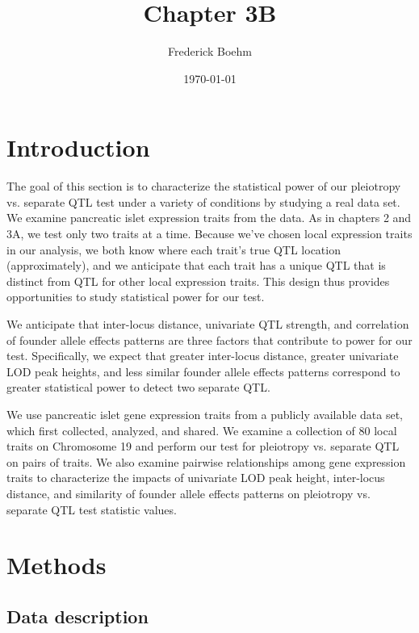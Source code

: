 \documentclass{article}
\title{Chapter 3B}
\author{Frederick Boehm}
\date{\today}
\begin{document}
\doublespacing
\maketitle
\listoftodos
\tableofcontents
\listoffigures
\listoftables



\section{Introduction}

The goal of this section is to characterize the statistical power of our pleiotropy vs. separate QTL test under a variety of conditions by studying a real data set. We examine pancreatic islet expression traits from the \citet{keller2018genetic} data. As in chapters 2 and 3A, we test only two traits at a time. Because we’ve chosen local expression traits in our analysis, we both know where each trait’s true QTL location (approximately), and we anticipate that each trait has a unique QTL that is distinct from QTL for other local expression traits. This design thus provides opportunities to study statistical power for our test.

We anticipate that inter-locus distance, univariate QTL strength, and correlation of founder allele effects patterns are three factors that contribute to power for our test. Specifically, we expect that greater inter-locus distance, greater univariate LOD peak heights, and less similar founder allele effects patterns correspond to greater statistical power to detect two separate QTL. 

We use pancreatic islet gene expression traits from a publicly available data set, which \citet{keller2018genetic} first collected, analyzed, and shared. We examine a collection of 80 local traits on Chromosome 19 and perform our test for pleiotropy vs. separate QTL on pairs of traits. We also examine pairwise relationships among gene expression traits to characterize the impacts of univariate LOD peak height, inter-locus distance, and similarity of founder allele effects patterns on pleiotropy vs. separate QTL test statistic values.



\section{Methods}

\subsection{Data description}
\end{document}
